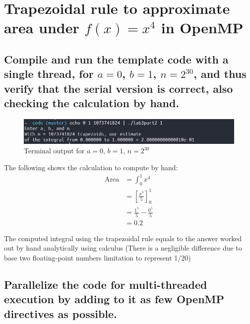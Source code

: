 
\section{Trapezoidal rule to approximate area under $f(x)=x^4$ in OpenMP}

\subsection{Compile and run the template code with a single thread, for $a=0$,
$b=1$, $n=2^{30}$, and thus verify that the serial version is correct, also
checking the calculation by hand.}

\begin{figure}[ht]
	\centering
	\includegraphics[width=\textwidth]{graphics/P2_a_terminal_output.PNG}
	\caption{Terminal output for $a=0$, $b=1$, $n=2^{30}$}
	\label{fig:P2_a}
\end{figure}


The following shows the calculation to compute by hand:
\vspace{1cm}
\begin{align*}
	\text{Area} &= \int_{0}^{1} x^4 \\
				&= \left[ \frac{x^5}{5} \right]^{1}_{0} \\
				&= \frac{1^5}{5} - \frac{0^5}{5} \\
				&= 0.2
\end{align*}

The computed integral using the trapezoidal rule equals to the answer worked out
by hand analytically using calculus (There is a negligible difference due to base
two floating-point numbers limitation to represent 1/20)

\subsection{Parallelize the code for multi-threaded execution by adding to 
it as few OpenMP directives as possible.}

\vspace{0.5cm}

	
